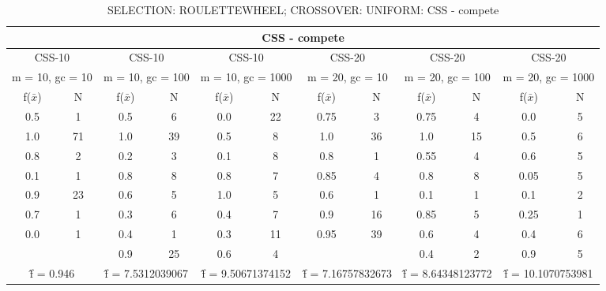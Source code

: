 \begin{table}[H]
	\centering
	\caption{SELECTION: ROULETTEWHEEL; CROSSOVER: UNIFORM: CSS - compete}
	\begin{adjustbox}{width=1\textwidth}
		\begin{tabular}{ |c|c||c|c||c|c||c|c||c|c||c|c| }
			\hline
			\multicolumn{12}{|c|}{CSS - compete} \\
			\hline
			\multicolumn{2}{|c||}{CSS-10} & \multicolumn{2}{c||}{CSS-10} & \multicolumn{2}{c||}{CSS-10} & \multicolumn{2}{c||}{CSS-20} & \multicolumn{2}{c||}{CSS-20} & \multicolumn{2}{c|}{CSS-20}\\
			\hline
			\multicolumn{2}{|c||}{m = 10, gc = 10} & \multicolumn{2}{c||}{m = 10, gc = 100} & \multicolumn{2}{c||}{m = 10, gc = 1000} & \multicolumn{2}{c||}{m = 20, gc = 10} & \multicolumn{2}{c||}{m = 20, gc = 100} & \multicolumn{2}{c|}{m = 20, gc = 1000}\\
			\hline
			f($\bar{x}$) & N & f($\bar{x}$) & N & f($\bar{x}$) & N & f($\bar{x}$) & N & f($\bar{x}$) & N & f($\bar{x}$) & N\\
			\hline
			\hline
			0.5 & 1 & 0.5 & 6 & 0.0 & 22 & 0.75 & 3 & 0.75 & 4 & 0.0 & 5\\
			1.0 & 71 & 1.0 & 39 & 0.5 & 8 & 1.0 & 36 & 1.0 & 15 & 0.5 & 6\\
			0.8 & 2 & 0.2 & 3 & 0.1 & 8 & 0.8 & 1 & 0.55 & 4 & 0.6 & 5\\
			0.1 & 1 & 0.8 & 8 & 0.8 & 7 & 0.85 & 4 & 0.8 & 8 & 0.05 & 5\\
			0.9 & 23 & 0.6 & 5 & 1.0 & 5 & 0.6 & 1 & 0.1 & 1 & 0.1 & 2\\
			0.7 & 1 & 0.3 & 6 & 0.4 & 7 & 0.9 & 16 & 0.85 & 5 & 0.25 & 1\\
			0.0 & 1 & 0.4 & 1 & 0.3 & 11 & 0.95 & 39 & 0.6 & 4 & 0.4 & 6\\
			&   & 0.9 & 25 & 0.6 & 4 &   &   & 0.4 & 2 & 0.9 & 5\\
			\hline
			\multicolumn{2}{|c||}{\^{f} = 0.946} & \multicolumn{2}{c||}{\^{f} = 7.5312039067} & \multicolumn{2}{c||}{\^{f} = 9.50671374152} & \multicolumn{2}{c||}{\^{f} = 7.16757832673} & \multicolumn{2}{c||}{\^{f} = 8.64348123772} & \multicolumn{2}{c|}{\^{f} = 10.1070753981}\\
			\hline
		\end{tabular}
	\end{adjustbox}
\end{table}
